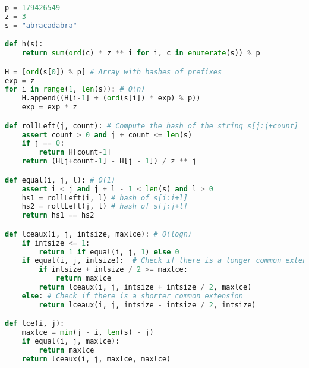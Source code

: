 \begin{lstlisting}[frame=single,language=Python,caption={Source code to compute the longest common extension efficiently.},label=listing:lce]
p = 179426549
z = 3
s = "abracadabra"

def h(s):
    return sum(ord(c) * z ** i for i, c in enumerate(s)) % p

H = [ord(s[0]) % p] # Array with hashes of prefixes
exp = z
for i in range(1, len(s)): # O(n)
    H.append((H[i-1] + (ord(s[i]) * exp) % p))
    exp = exp * z

def rollLeft(j, count): # Compute the hash of the string s[j:j+count]
    assert count > 0 and j + count <= len(s)
    if j == 0:
        return H[count-1]
    return (H[j+count-1] - H[j - 1]) / z ** j

def equal(i, j, l): # O(1)
    assert i < j and j + l - 1 < len(s) and l > 0
    hs1 = rollLeft(i, l) # hash of s[i:i+l]
    hs2 = rollLeft(j, l) # hash of s[j:j+l]
    return hs1 == hs2

def lceaux(i, j, intsize, maxlce): # O(logn)
    if intsize <= 1:
        return 1 if equal(i, j, 1) else 0
    if equal(i, j, intsize):  # Check if there is a longer common extension
        if intsize + intsize / 2 >= maxlce:
            return maxlce
        return lceaux(i, j, intsize + intsize / 2, maxlce)
    else: # Check if there is a shorter common extension
        return lceaux(i, j, intsize - intsize / 2, intsize)

def lce(i, j):
    maxlce = min(j - i, len(s) - j)
    if equal(i, j, maxlce):
        return maxlce
    return lceaux(i, j, maxlce, maxlce)
\end{lstlisting}

